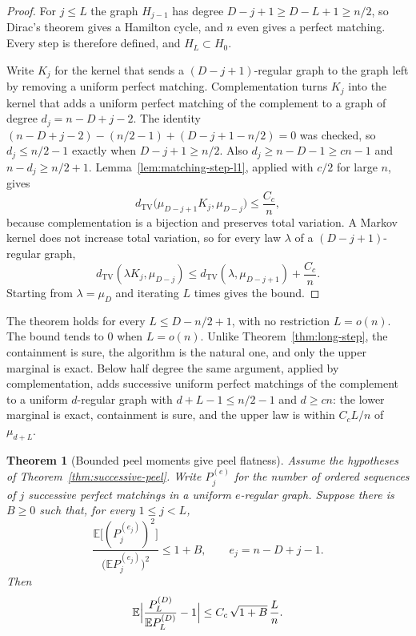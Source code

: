 \documentclass[11pt]{article}
\newtheorem{theorem}{Theorem}
\newcommand{\EE}{\mathbb{E}}
\newcommand{\dTV}{d_{\mathrm{TV}}}
\begin{document}
\begin{proof}
For \(j\le L\) the graph \(H_{j-1}\) has degree \(D-j+1\ge D-L+1\ge n/2\), so
Dirac's theorem gives a Hamilton cycle, and \(n\) even gives a perfect
matching. Every step is therefore defined, and \(H_L\subset H_0\).

Write \(K_j\) for the kernel that sends a \((D-j+1)\)-regular graph to the
graph left by removing a uniform perfect matching.
Complementation turns \(K_j\) into the kernel that adds a uniform perfect
matching of the complement to a graph of degree \(d_j=n-D+j-2\).
The identity
\((n-D+j-2)-(n/2-1)+(D-j+1-n/2)=0\)
was checked, so \(d_j\le n/2-1\) exactly when \(D-j+1\ge n/2\).
Also \(d_j\ge n-D-1\ge cn-1\) and \(n-d_j\ge n/2+1\).
Lemma~\ref{lem:matching-step-l1}, applied with \(c/2\) for large \(n\), gives
\[
\dTV\bigl(\mu_{D-j+1}K_j,\mu_{D-j}\bigr)\le\frac{C_c}{n},
\]
because complementation is a bijection and preserves total variation.
A Markov kernel does not increase total variation, so for every law
\(\lambda\) of a \((D-j+1)\)-regular graph,
\[
\dTV(\lambda K_j,\mu_{D-j})
\le
\dTV(\lambda,\mu_{D-j+1})+\frac{C_c}{n}.
\]
Starting from \(\lambda=\mu_D\) and iterating \(L\) times gives the bound.
\end{proof}

The theorem holds for every \(L\le D-n/2+1\), with no restriction
\(L=o(n)\). The bound tends to \(0\) when \(L=o(n)\).
Unlike Theorem~\ref{thm:long-step}, the containment is sure, the algorithm is
the natural one, and only the upper marginal is exact.
Below half degree the same argument, applied by complementation, adds
successive uniform perfect matchings of the complement to a uniform
\(d\)-regular graph with \(d+L-1\le n/2-1\) and \(d\ge cn\): the lower marginal is exact,
containment is sure, and the upper law is within \(C_cL/n\) of
\(\mu_{d+L}\).

\begin{theorem}[Bounded peel moments give peel flatness]
\label{thm:peel-bounded-to-flat}
Assume the hypotheses of Theorem~\ref{thm:successive-peel}.
Write \(P_j^{(e)}\) for the number of ordered sequences of \(j\) successive
perfect matchings in a uniform \(e\)-regular graph.
Suppose there is \(B\ge 0\) such that, for every \(1\le j<L\),
\[
\frac{\EE\bigl[(P_{j}^{(e_j)})^2\bigr]}{\bigl(\EE P_{j}^{(e_j)}\bigr)^2}
\le
1+B,
\qquad
e_j=n-D+j-1.
\]
Then
\[
\EE\Bigl|\frac{P_L^{(D)}}{\EE P_L^{(D)}}-1\Bigr|
\le
C_c\,\sqrt{1+B}\,\frac{L}{n}.
\]
\end{theorem}
\end{document}
